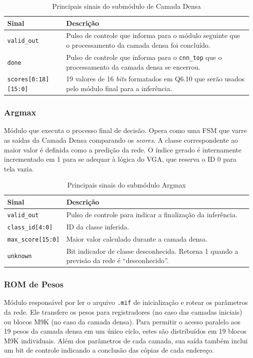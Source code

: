 \begin{table}[H]
\centering
\caption{Principais sinais do submódulo de Camada Densa}
\label{tab:sinais_camada_densa}
\small
\begin{tabularx}{\textwidth}{l X}
\toprule
\textbf{Sinal} & \textbf{Descrição} \\
\midrule
\texttt{valid\_out} & Pulso de controle que informa para o módulo seguinte que o processamento da camada densa foi concluído. \\
\texttt{done} & Pulso de controle que informa para o \texttt{cnn\_top} que o processamento da camada densa se encerrou. \\
\texttt{scores[0:18][15:0]} & 19 valores de 16 \textit{bits} formatados em Q6.10 que serão usados pelo módulo final para a inferência. \\
\bottomrule
\end{tabularx}
\end{table}

\subsubsection{Argmax}
Módulo que executa o processo final de decisão. Opera como uma FSM que varre as saídas da Camada Densa comparando os \textit{scores}. A classe correspondente ao maior valor é definida como a predição da rede. O índice gerado é internamente incrementado em 1 para se adequar à lógica do VGA, que reserva o ID 0 para tela vazia.

\begin{table}[H]
\centering
\caption{Principais sinais do submódulo Argmax}
\label{tab:sinais_argmax}
\small
\begin{tabularx}{\textwidth}{l X}
\toprule
\textbf{Sinal} & \textbf{Descrição} \\
\midrule
\texttt{valid\_out} & Pulso de controle para indicar a finalização da inferência. \\
\texttt{class\_id[4:0]} & ID da classe inferida. \\
\texttt{max\_score[15:0]} & Maior valor calculado durante a camada densa. \\
\texttt{unknown} & Bit indicador de classe desconhecida. Retorna 1 quando a previsão da rede é ``desconhecido''. \\
\bottomrule
\end{tabularx}
\end{table}

\subsubsection{ROM de Pesos}
Módulo responsável por ler o arquivo \texttt{.mif} de inicialização e rotear os parâmetros da rede. Ele transfere os pesos para registradores (no caso das camadas iniciais) ou blocos M9K (no caso da camada densa). Para permitir o acesso paralelo aos 19 pesos da camada densa em um único ciclo, estes são distribuídos em 19 blocos M9K individuais. Além dos parâmetros de cada camada, sua saída também inclui um bit de controle indicando a conclusão das cópias de cada endereço.

